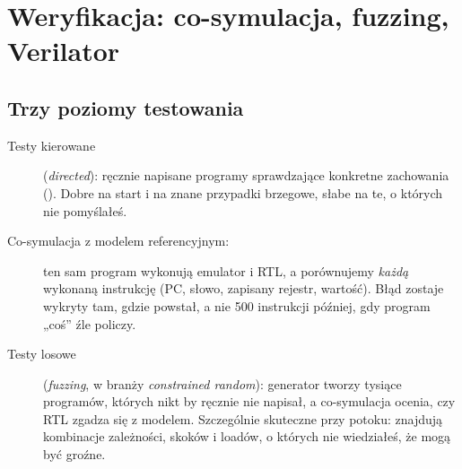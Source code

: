 \chapter{Weryfikacja: co-symulacja, fuzzing, Verilator}
\label{ch:wer}


\section{Trzy poziomy testowania}

\begin{description}
  \item[Testy kierowane] (\emph{directed}): ręcznie napisane programy
    sprawdzające konkretne zachowania (). Dobre na
    start i na znane przypadki brzegowe, słabe na te, o których nie
    pomyślałeś.
  \item[Co-symulacja z modelem referencyjnym:] ten sam program wykonują
    emulator i RTL, a porównujemy \emph{każdą} wykonaną instrukcję (PC, słowo,
    zapisany rejestr, wartość). Błąd zostaje wykryty tam, gdzie powstał, a nie
    500 instrukcji później, gdy program „coś” źle policzy.
  \item[Testy losowe] (\emph{fuzzing}, w branży \emph{constrained random}):
    generator tworzy tysiące programów, których nikt by ręcznie nie napisał, a
    co-symulacja ocenia, czy RTL zgadza się z modelem. Szczególnie skuteczne
    przy potoku: znajdują kombinacje zależności, skoków i loadów, o których nie
    wiedziałeś, że mogą być groźne.
\end{description}

